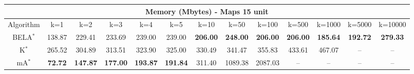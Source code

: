 \begin{tabular}{c|cccccccccccc}\toprule
\multicolumn{13}{c}{Memory (Mbytes) - Maps 15 unit}\\ \midrule
Algorithm & k=1 & k=2 & k=3 & k=4 & k=5 & k=10 & k=50 & k=100 & k=500 & k=1000 & k=5000 & k=10000 \\ \midrule
BELA$^*$ & 138.87 & 229.41 & 233.69 & 239.00 & 239.00 & \textbf{206.00} & \textbf{248.00} & \textbf{206.00} & \textbf{206.00} & \textbf{185.64} & \textbf{192.72} & \textbf{279.33} \\
K$^*$ & 265.52 & 304.89 & 313.51 & 323.90 & 325.00 & 330.49 & 341.47 & 355.83 & 433.61 & 467.07 & -- & -- \\
mA$^*$ & \textbf{72.72} & \textbf{147.87} & \textbf{177.00} & \textbf{193.87} & \textbf{191.84} & 311.40 & 1089.38 & 2087.03 & -- & -- & -- & -- \\ \bottomrule 
\end{tabular}

